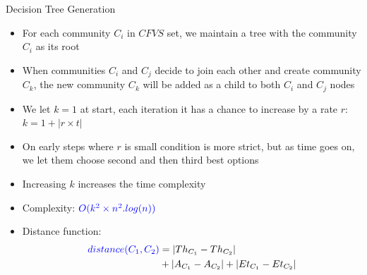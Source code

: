 \documentclass{beamer}
\begin{document}
\begin{frame}{Decision Tree Generation}

    \footnotesize
    \begin{itemize}    
        \item For each community $C_i$ in $CFVS$ set, we maintain a tree with the community $C_i$ as its root
        \item When communities $C_i$ and $C_j$ decide to join each other and create community $C_k$, the new community $C_k$ will be added as a child to both $C_i$ and $C_j$ nodes
        \item We let $k = 1$ at start, each iteration it has a chance to increase by a rate $r$: $k = 1 + |r \times t|$
        \item On early steps where $r$ is small condition is more strict, but as time goes on, we let them choose second and then third best options
        \item Increasing $k$  increases the time complexity
        \item Complexity: ${\color{blue}O(k^2 \times n^2.log(n))}$
        \item Distance function:
        \begin{equation*}\label{distance_c}
            \begin{split}
                {\color{blue}distance (C_1, C_2)} & = |Th_{C_1} - Th_{C_2}| \\
                                & + |A_{C_1} - A_{C_2}| + |Et_{C_1} - Et_{C_2}|
            \end{split}
        \end{equation*}
    \end{itemize}
\end{frame}
\end{document}
